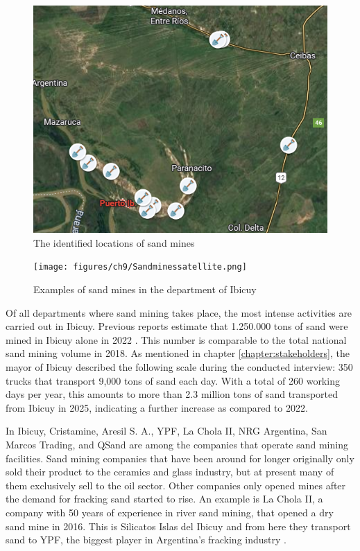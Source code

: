 \begin{figure}[H]
    \centering
    \includegraphics[width=0.6\linewidth]{figures/ch9/SandMap.png}
    \caption{The identified locations of sand mines}
    \label{fig:sandminemap}
\end{figure}

\begin{figure}[H]
    \centering
    \texttt{[image: figures/ch9/Sandminessatellite.png]}
    \caption{Examples of sand mines in the department of Ibicuy}
    \label{fig:sandminessatellite}
\end{figure}

Of all departments where sand mining takes place, the most intense activities are carried out in Ibicuy. Previous reports estimate that 1.250.000 tons of sand were mined in Ibicuy alone in 2022 \autocite{fogliaSedArena2023}. This number is comparable to the total national sand mining volume in 2018. As mentioned in chapter \ref{chapter:stakeholders}, the mayor of Ibicuy described the following scale during the conducted interview: 350 trucks that transport 9,000 tons of sand each day. With a total of 260 working days per year, this amounts to more than 2.3 million tons of sand transported from Ibicuy in 2025, indicating a further increase as compared to 2022.

In Ibicuy, Cristamine, Aresil S. A., YPF, La Chola II, NRG Argentina, San Marcos Trading, and QSand are among the companies that operate sand mining facilities. Sand mining companies that have been around for longer originally only sold their product to the ceramics and glass industry, but at present many of them exclusively sell to the oil sector. Other companies only opened mines after the demand for fracking sand started to rise. An example is La Chola II, a company with 50 years of experience in river sand mining, that opened a dry sand mine in 2016. This is Silicatos Islas del Ibicuy and from here they transport sand to YPF, the biggest player in Argentina's fracking industry \autocite{fogliaSedArena2023}.

